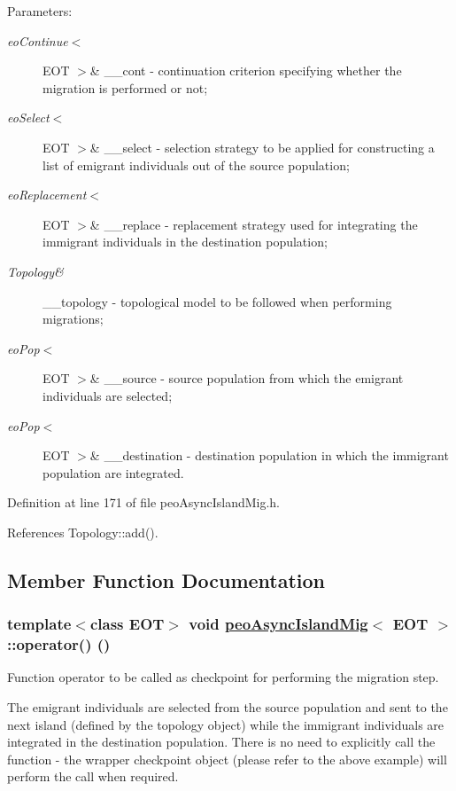 \begin{Desc}
\item[Parameters:]
\begin{description}
\item[{\em eo\-Continue$<$}]EOT $>$\& \_\-\_\-cont - continuation criterion specifying whether the migration is performed or not; \item[{\em eo\-Select$<$}]EOT $>$\& \_\-\_\-select - selection strategy to be applied for constructing a list of emigrant individuals out of the source population; \item[{\em eo\-Replacement$<$}]EOT $>$\& \_\-\_\-replace - replacement strategy used for integrating the immigrant individuals in the destination population; \item[{\em Topology\&}]\_\-\_\-topology - topological model to be followed when performing migrations; \item[{\em eo\-Pop$<$}]EOT $>$\& \_\-\_\-source - source population from which the emigrant individuals are selected; \item[{\em eo\-Pop$<$}]EOT $>$\& \_\-\_\-destination - destination population in which the immigrant population are integrated. \end{description}
\end{Desc}


Definition at line 171 of file peo\-Async\-Island\-Mig.h.

References Topology::add().

\subsection{Member Function Documentation}
\hypertarget{classpeoAsyncIslandMig_13581e54425727a7f785ca8a6df527b5}{
\subsubsection[operator()]{\setlength{\rightskip}{0pt plus 5cm}template$<$class EOT$>$ void \hyperlink{classpeoAsyncIslandMig}{peo\-Async\-Island\-Mig}$<$ EOT $>$::operator() ()}}
\label{classpeoAsyncIslandMig_13581e54425727a7f785ca8a6df527b5}


Function operator to be called as checkpoint for performing the migration step. 

The emigrant individuals are selected from the source population and sent to the next island (defined by the topology object) while the immigrant individuals are integrated in the destination population. There is no need to explicitly call the function - the wrapper checkpoint object (please refer to the above example) will perform the call when required. 

